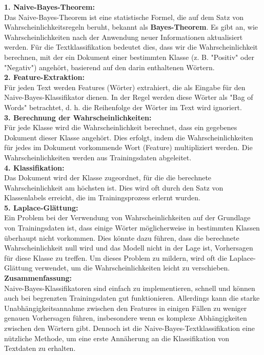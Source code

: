 \documentclass[12pt]{article}
\begin{document}
%
\textbf{1. Naive-Bayes-Theorem:}\\
Das Naive-Bayes-Theorem ist eine statistische Formel, die auf dem Satz von Wahrscheinlichkeitsregeln beruht, bekannt als \textbf{Bayes-Theorem}. Es gibt an, wie Wahrscheinlichkeiten nach der Anwendung neuer Informationen aktualisiert werden. Für die Textklassifikation bedeutet dies, dass wir die Wahrscheinlichkeit berechnen, mit der ein Dokument einer bestimmten Klasse (z. B. "Positiv" oder "Negativ") angehört, basierend auf den darin enthaltenen Wörtern.\\
\textbf{2. Feature-Extraktion:}\\
Für jeden Text werden Features (Wörter) extrahiert, die als Eingabe für den Naive-Bayes-Klassifikator dienen. In der Regel werden diese Wörter als "Bag of Words" betrachtet, d. h. die Reihenfolge der Wörter im Text wird ignoriert.\\
\textbf{3. Berechnung der Wahrscheinlichkeiten:}\\
Für jede Klasse wird die Wahrscheinlichkeit berechnet, dass ein gegebenes Dokument dieser Klasse angehört. Dies erfolgt, indem die Wahrscheinlichkeiten für jedes im Dokument vorkommende Wort (Feature) multipliziert werden. Die Wahrscheinlichkeiten werden aus Trainingsdaten abgeleitet.\\
\textbf{4. Klassifikation:}\\
Das Dokument wird der Klasse zugeordnet, für die die berechnete Wahrscheinlichkeit am höchsten ist. Dies wird oft durch den Satz von Klassenlabels erreicht, die im Trainingsprozess erlernt wurden.\\
\textbf{5. Laplace-Glättung:}\\
Ein Problem bei der Verwendung von Wahrscheinlichkeiten auf der Grundlage von Trainingsdaten ist, dass einige Wörter möglicherweise in bestimmten Klassen überhaupt nicht vorkommen. Dies könnte dazu führen, dass die berechnete Wahrscheinlichkeit null wird und das Modell nicht in der Lage ist, Vorhersagen für diese Klasse zu treffen. Um dieses Problem zu mildern, wird oft die Laplace-Glättung verwendet, um die Wahrscheinlichkeiten leicht zu verschieben.\\[0.2cm]
%
\textbf{Zusammenfassung:}\\
Naive-Bayes-Klassifikatoren sind einfach zu implementieren, schnell und können auch bei begrenzten Trainingsdaten gut funktionieren. Allerdings kann die starke Unabhängigkeitsannahme zwischen den Features in einigen Fällen zu weniger genauen Vorhersagen führen, insbesondere wenn es komplexe Abhängigkeiten zwischen den Wörtern gibt. Dennoch ist die Naive-Bayes-Textklassifikation eine nützliche Methode, um eine erste Annäherung an die Klassifikation von Textdaten zu erhalten.
\end{document}
